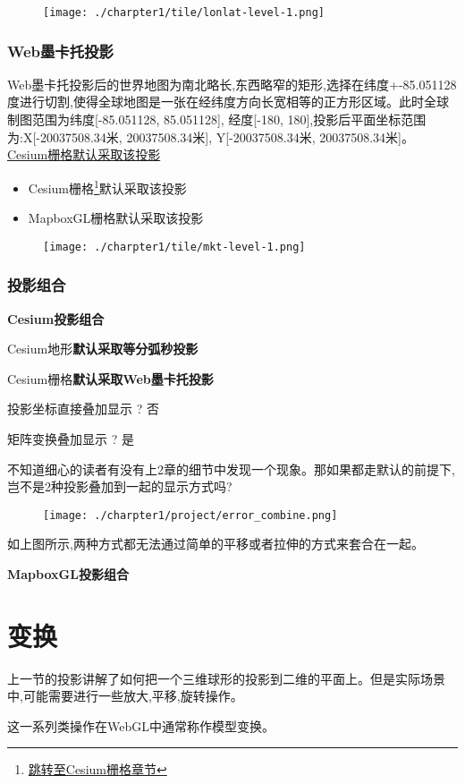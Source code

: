 \begin{figure}[!htb]
	\centering
	\texttt{[image: ./charpter1/tile/lonlat-level-1.png]}
\end{figure}
\subsubsection{Web墨卡托投影}
Web墨卡托投影后的世界地图为南北略长,东西略窄的矩形,选择在纬度+-85.051128度进行切割,使得全球地图是一张在经纬度方向长宽相等的正方形区域。此时全球制图范围为纬度[-85.051128, 85.051128], 经度[-180, 180],投影后平面坐标范围为:X[-20037508.34米, 20037508.34米], Y[-20037508.34米, 20037508.34米]。
\hyperref[sec:cesium-terrain]{Cesium栅格默认采取该投影}
\begin{itemize}
	\item Cesium栅格\footnote{\hyperref[sec:cesium-raster]{跳转至Cesium栅格章节}}默认采取该投影
	\item MapboxGL栅格默认采取该投影
\end{itemize}
\begin{figure}[!htb]
	\centering
	\texttt{[image: ./charpter1/tile/mkt-level-1.png]}
\end{figure}
\subsubsection{投影组合}
\textbf{Cesium投影组合}

\begin{introduction}
	\item Cesium地形\textbf{默认采取等分弧秒投影}
	\item Cesium栅格\textbf{默认采取Web墨卡托投影}
	\item 投影坐标直接叠加显示 ? 否
	\item 矩阵变换叠加显示 ? 是
\end{introduction}
不知道细心的读者有没有上2章的细节中发现一个现象。那如果都走默认的前提下,岂不是2种投影叠加到一起的显示方式吗?
\begin{figure}[!htb]
	\centering
	\texttt{[image: ./charpter1/project/error\_combine.png]}
\end{figure}
\begin{note}
	如上图所示,两种方式都无法通过简单的平移或者拉伸的方式来套合在一起。
\end{note}

\textbf{MapboxGL投影组合}

\section{变换}
上一节的投影讲解了如何把一个三维球形的投影到二维的平面上。但是实际场景中,可能需要进行一些放大,平移,旋转操作。
\begin{note}
	这一系列类操作在WebGL中通常称作模型变换。
\end{note}

